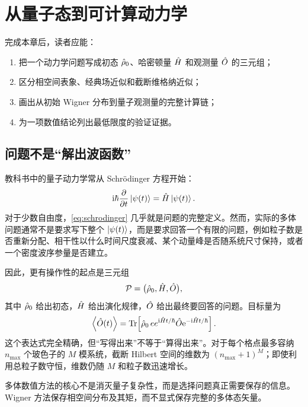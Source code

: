 \chapter{从量子态到可计算动力学}
\label{ch:motivation}

\begin{learningobjectives}
完成本章后，读者应能：
\begin{enumerate}
  \item 把一个动力学问题写成初态 $\hat\rho_0$、哈密顿量 $\hat H$ 和观测量 $\hat O$ 的三元组；
  \item 区分相空间表象、经典场近似和截断维格纳近似；
  \item 画出从初始 Wigner 分布到量子观测量的完整计算链；
  \item 为一项数值结论列出最低限度的验证证据。
\end{enumerate}
\end{learningobjectives}

\section{问题不是“解出波函数”}

教科书中的量子动力学常从 Schrödinger 方程开始：
\begin{equation}
  \mathrm{i}\hbar\frac{\partial }{\partial t}\left\lvert \psi(t)\right\rangle=\hat H\left\lvert \psi(t)\right\rangle.
  \label{eq:schrodinger}
\end{equation}
对于少数自由度，\cref{eq:schrodinger} 几乎就是问题的完整定义。然而，实际的多体问题通常不是要求写下整个 $\left\lvert \psi(t)\right\rangle$，而是要求回答一个有限的问题，例如粒子数是否重新分配、相干性以什么时间尺度衰减、某个动量峰是否随系统尺寸保持，或者一个密度波序参量是否建立。

因此，更有操作性的起点是三元组
\begin{equation}
  \mathcal{P}=\bigl(\hat\rho_0,\hat H,\hat O\bigr),
  \label{eq:problem-triple}
\end{equation}
其中 $\hat\rho_0$ 给出初态，$\hat H$ 给出演化规律，$\hat O$ 给出最终要回答的问题。目标量为
\begin{equation}
  \left\langle \hat O(t)\right\rangle
  =\operatorname{Tr}\!\left[\hat\rho_0\,ee^{\mathrm{i}\hat H t/\hbar}
  \hat O\mathrm{e}^{-\mathrm{i}\hat H t/\hbar}\right].
  \label{eq:heisenberg-expectation}
\end{equation}
这个表达式完全精确，但“写得出来”不等于“算得出来”。对于每个格点最多容纳 $n_{\max}$ 个玻色子的 $M$ 模系统，截断 Hilbert 空间的维数为 $(n_{\max}+1)^M$；即使利用总粒子数守恒，维数仍随 $M$ 和粒子数迅速增长。

\begin{intuitionbox}
多体数值方法的核心不是消灭量子复杂性，而是选择问题真正需要保存的信息。Wigner 方法保存相空间分布及其矩，而不显式保存完整的多体态矢量。
\end{intuitionbox}

